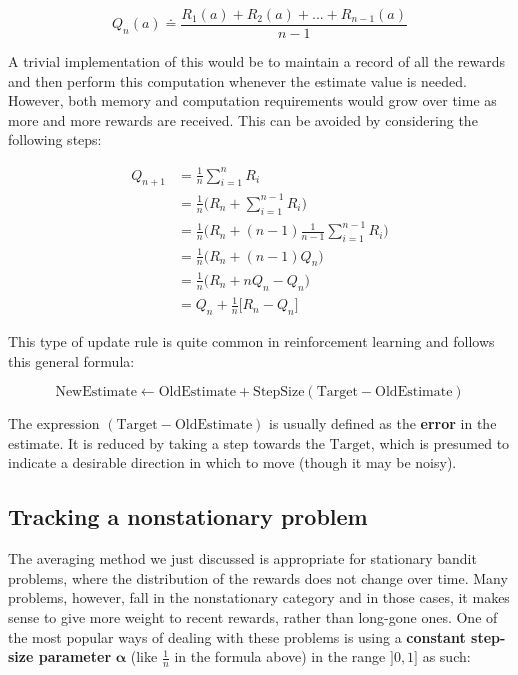 \begin{equation*}
    Q_n(a) \doteq \frac{R_1(a) + R_2(a) + ... + R_{n-1}(a)}{n-1}
\end{equation*}

A trivial implementation of this would be to maintain a record of all the rewards and then perform this computation whenever the estimate value is needed. However, both memory and computation requirements would grow over time as more and more rewards are received. This can be avoided by considering the following steps:

\begin{equation*}
    \begin{split}
        Q_{n+1} & = \frac{1}{n} \sum_{i=1}^{n} R_i\\
        & = \frac{1}{n} \Big( R_n + \sum_{i=1}^{n-1} R_i \Big) \\
        & = \frac{1}{n} \Big( R_n + (n-1) \frac{1}{n-1} \sum_{i=1}^{n-1} R_i \Big) \\
        & = \frac{1}{n} \Big( R_n + (n-1) Q_n \Big) \\
        & = \frac{1}{n} \Big( R_n + n Q_n - Q_n \Big) \\
        & = Q_n + \frac{1}{n} \Big[R_n - Q_n \Big]
    \end{split}
\end{equation*}

This type of update rule is quite common in reinforcement learning and follows this general formula:

\begin{equation}
    \text{NewEstimate} \leftarrow \text{OldEstimate} + \text{StepSize}(\text{Target} - \text{OldEstimate})
    \label{eq:ch3-generalrlupdaterule}
\end{equation}

The expression $(\text{Target} - \text{OldEstimate})$ is usually defined as the \textbf{error} in the estimate. It is reduced by taking a step towards the $\text{Target}$, which is presumed to indicate a desirable direction in which to move (though it may be noisy).

\subsection{Tracking a nonstationary problem}
The averaging method we just discussed is appropriate for stationary bandit problems, where the distribution of the rewards does not change over time. Many problems, however, fall in the nonstationary category and in those cases, it makes sense to give more weight to recent rewards, rather than long-gone ones. One of the most popular ways of dealing with these problems is using a \textbf{constant step-size parameter} $\boldsymbol{\alpha}$ (like $\frac{1}{n}$ in the formula above) in the range $]0,1]$ as such:

